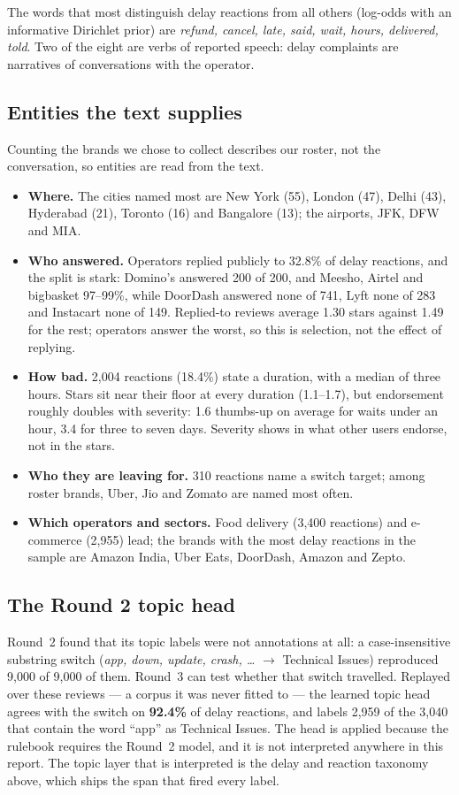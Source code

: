\documentclass[11pt,a4paper]{article}
\begin{document}
The words that most distinguish delay reactions from all others (log-odds with an informative Dirichlet prior) are \emph{refund, cancel, late, said, wait, hours, delivered, told}. Two of the eight are verbs of reported speech: delay complaints are narratives of conversations with the operator.

\subsection{Entities the text supplies}\label{sec:entities}

Counting the brands we chose to collect describes our roster, not the conversation, so entities are read from the text.
\begin{itemize}
\item \textbf{Where.} The cities named most are New York (55), London (47), Delhi (43), Hyderabad (21), Toronto (16) and Bangalore (13); the airports, JFK, DFW and MIA.
\item \textbf{Who answered.} Operators replied publicly to 32.8\% of delay reactions, and the split is stark: Domino's answered 200 of 200, and Meesho, Airtel and bigbasket 97--99\%, while DoorDash answered none of 741, Lyft none of 283 and Instacart none of 149. Replied-to reviews average 1.30 stars against 1.49 for the rest; operators answer the worst, so this is selection, not the effect of replying.
\item \textbf{How bad.} 2,004 reactions (18.4\%) state a duration, with a median of three hours. Stars sit near their floor at every duration (1.1--1.7), but endorsement roughly doubles with severity: 1.6 thumbs-up on average for waits under an hour, 3.4 for three to seven days. Severity shows in what other users endorse, not in the stars.
\item \textbf{Who they are leaving for.} 310 reactions name a switch target; among roster brands, Uber, Jio and Zomato are named most often.
\item \textbf{Which operators and sectors.} Food delivery (3,400 reactions) and e-commerce (2,955) lead; the brands with the most delay reactions in the sample are Amazon India, Uber Eats, DoorDash, Amazon and Zepto.
\end{itemize}

\subsection{The Round 2 topic head}

Round~2 found that its topic labels were not annotations at all: a case-insensitive substring switch (\emph{app, down, update, crash, \ldots} $\to$ Technical Issues) reproduced 9,000 of 9,000 of them. Round~3 can test whether that switch travelled. Replayed over these reviews --- a corpus it was never fitted to --- the learned topic head agrees with the switch on \textbf{92.4\%} of delay reactions, and labels 2,959 of the 3,040 that contain the word ``app'' as Technical Issues. The head is applied because the rulebook requires the Round~2 model, and it is not interpreted anywhere in this report. The topic layer that is interpreted is the delay and reaction taxonomy above, which ships the span that fired every label.
\end{document}
